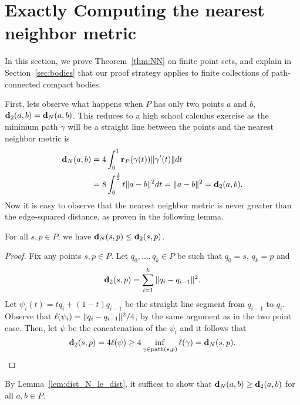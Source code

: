 \section{Exactly Computing the nearest neighbor metric}
\label{sec:NN}
In this section, we prove Theorem~\ref{thm:NN} on finite point sets, and
explain in Section~\ref{sec:bodies} that our proof strategy applies to
finite collections of path-connected compact bodies.

  First, lets observe what happens when $P$ has only two points $a$ and
$b$, $\mathbf{d}_2(a,b) = \mathbf{d}_N(a,b)$.  This reduces to a high school calculus
exercise as the minimum path $\gamma$ will be a straight line between the
points and the nearest neighbor metric is
\begin{align*}
  \mathbf{d}_N(a,b) &= 4\int_0^1 \mathbf{r}_P(\gamma(t))\|\gamma'(t)\|dt \\
  & = 8\int_0^{\frac{1}{2}} t \|a - b\|^2 dt = \|a - b\|^2 = \mathbf{d}_2(a,b).
\end{align*}
  Now it is easy to observe that the
  nearest neighbor metric is never greater than the
  edge-squared distance, as proven in the following lemma.

  \begin{lemma}\label{lem:dist_N_le_dist}
    For all $s,p\in P$, we have $\mathbf{d}_N(s,p)\le \mathbf{d}_2(s,p)$.
  \end{lemma}
  \begin{proof}
    Fix any points $s,p\in P$.
    Let $q_0,\ldots, q_k \in P$ be such that $q_0 = s$, $q_k = p$ and
    \[
      \mathbf{d}_2(s,p) = \sum_{i=1}^k \|q_i - q_{i-1}\|^2.
    \]
    Let $\psi_i(t) = tq_i + (1-t)q_{i-1}$ be the straight line segment from $q_{i-1}$ to $q_i$.
    Observe that $\ell(\psi_i) = \|q_i - q_{i-1}\|^2 / 4$, by the same argument as in the two point case.
    Then, let $\psi$ be the concatenation of the $\psi_i$ and it follows that
    \[
      \mathbf{d}_2(s,p) = 4 \ell(\psi) \ge 4 \inf_{\gamma\in \mathrm{path}(s,p)} \ell(\gamma) = \mathbf{d}_N(s,p).
    \]
  \end{proof}

  By Lemma~\ref{lem:dist_N_le_dist}, it suffices to show that $\mathbf{d}_N(a, b) \geq \mathbf{d}_2(a,b)$ for all $a, b \in P$.

